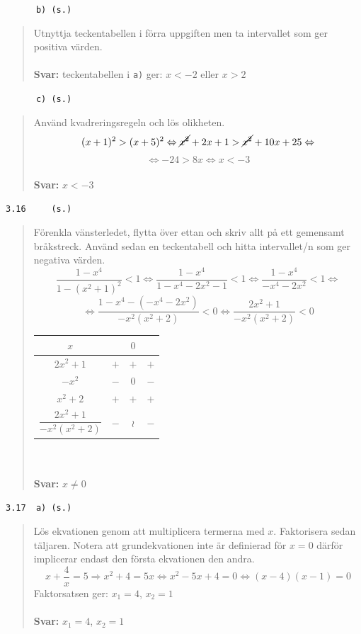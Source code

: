 \documentclass[a4paper]{article}
\newcommand{\tskcol}[1]{\textcolor{tskcol}{#1}}
\begin{document}
	\texttt{\tskcol{~~~~~~b) (s.)}}
	\begin{quotation}
		\noindent
		Utnyttja teckentabellen i förra uppgiften men ta intervallet som ger positiva värden.
		\\ \\
		\textbf{Svar:} teckentabellen i \texttt{a)} ger: $x<-2$ eller $x>2$
	\end{quotation}
	
	\texttt{\tskcol{~~~~~~c) (s.)}}
	\begin{quotation}
		\noindent
		Använd kvadreringsregeln och lös olikheten.
		\[(x+1)^2>(x+5)^2 \Leftrightarrow
		\cancel{x^2}+2x+1>\cancel{x^2}+10x+25\Leftrightarrow \]
		\[\Leftrightarrow -24>8x \Leftrightarrow
		x<-3\]
		\\
		\textbf{Svar:} $x<-3$ 
	\end{quotation}
	
	\pagebreak
	\texttt{\tskcol{3.16~~~~ (s.)}}
	\begin{quotation}
		\noindent
		Förenkla vänsterledet, flytta över ettan och skriv allt på ett gemensamt bråkstreck. Använd sedan en teckentabell och hitta intervallet/n som ger negativa värden.
		\[\dfrac{1-x^4}{1-(x^2+1)^2}<1 \Leftrightarrow
		\dfrac{1-x^4}{1-x^4-2x^2-1}<1 \Leftrightarrow
		\dfrac{1-x^4}{-x^4-2x^2}<1 \Leftrightarrow\]
		\[\Leftrightarrow \dfrac{1-x^4-(-x^4-2x^2)}{-x^2(x^2+2)}<0 \Leftrightarrow
		\dfrac{2x^2+1}{-x^2(x^2+2)}<0\]
		\begin{tabular}{c|c|c|c}
			$x$ & & $0$ & \\ \hline
			$2x^2+1$                      & $+$ & $+$ & $+$ \\
			$-x^2$                        & $-$ & $0$ & $-$ \\
			$x^2+2$                       & $+$ & $+$ & $+$ \\ \hline
			$\dfrac{2x^2+1}{-x^2(x^2+2)}$ & $-$ &$\wr$& $-$ 
		\end{tabular}
		\\ \\
		\textbf{Svar:} $x\neq 0$
	\end{quotation}
	
	\texttt{\tskcol{3.17~~a) (s.)}}
	\begin{quotation}
		\noindent
		Lös ekvationen genom att multiplicera termerna med $x$. Faktorisera sedan täljaren. Notera att grundekvationen inte är definierad för $x=0$ därför implicerar endast den första ekvationen den andra.
		\[x+\dfrac{4}{x}=5 \Rightarrow
		x^2+4=5x \Leftrightarrow
		x^2-5x+4=0 \Leftrightarrow
		(x-4)(x-1)=0\]
		Faktorsatsen ger:
		$x_1=4$, $x_2=1$
		\\ \\
		\textbf{Svar:} $x_1=4$, $x_2=1$
	\end{quotation}
	
\end{document}
